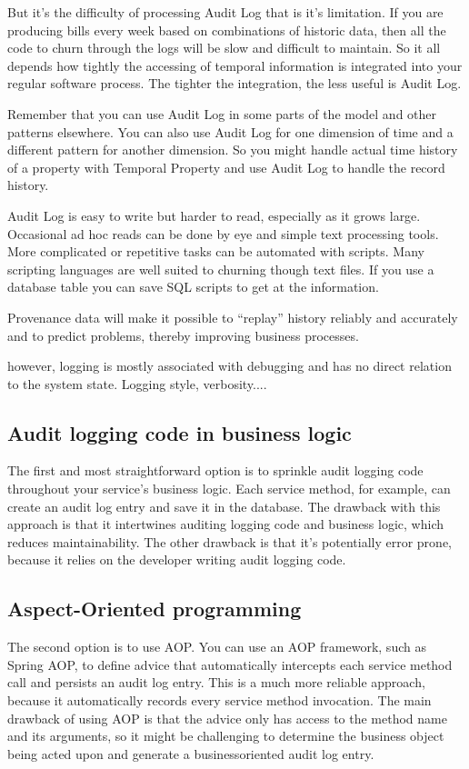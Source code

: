 But it's the difficulty of processing Audit Log that is it's limitation. If you are producing bills every week based on combinations of historic data, then all the code to churn through the logs will be slow and difficult to maintain. So it all depends how tightly the accessing of temporal information is integrated into your regular software process. The tighter the integration, the less useful is Audit Log.

Remember that you can use Audit Log in some parts of the model and other patterns elsewhere. You can also use Audit Log for one dimension of time and a different pattern for another dimension. So you might handle actual time history of a property with Temporal Property and use Audit Log to handle the record history.

Audit Log is easy to write but harder to read, especially as it grows large. Occasional ad hoc reads can be done by eye and simple text processing tools. More complicated or repetitive tasks can be automated with scripts. Many scripting languages are well suited to churning though text files. If you use a database table you can save SQL scripts to get at the information.

Provenance data will make it possible to “replay” history reliably and accurately and to predict problems, thereby improving business processes.

however, logging is mostly associated with debugging and has no direct relation to the system state. Logging style, verbosity....

\subsection{Audit logging code in business logic}

The first and most straightforward option is to sprinkle audit logging code throughout your service’s business logic. Each service method, for example, can create an
audit log entry and save it in the database. The drawback with this approach is that it
intertwines auditing logging code and business logic, which reduces maintainability.
The other drawback is that it’s potentially error prone, because it relies on the developer writing audit logging code.

\subsection{Aspect-Oriented programming}

The second option is to use AOP. You can use an AOP framework, such as Spring
AOP, to define advice that automatically intercepts each service method call and persists an audit log entry. This is a much more reliable approach, because it automatically records every service method invocation. The main drawback of using AOP is
that the advice only has access to the method name and its arguments, so it might be
challenging to determine the business object being acted upon and generate a businessoriented audit log entry.

